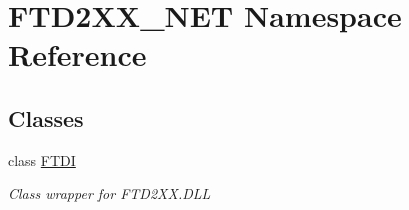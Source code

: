 \hypertarget{namespace_f_t_d2_x_x___n_e_t}{}\section{F\+T\+D2\+X\+X\+\_\+\+N\+ET Namespace Reference}
\label{namespace_f_t_d2_x_x___n_e_t}
\subsection*{Classes}
\begin{DoxyCompactItemize}
\item 
class \mbox{\hyperlink{class_f_t_d2_x_x___n_e_t_1_1_f_t_d_i}{F\+T\+DI}}
\begin{DoxyCompactList}\small\item\em Class wrapper for F\+T\+D2\+X\+X.\+D\+LL \end{DoxyCompactList}\end{DoxyCompactItemize}
